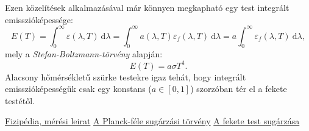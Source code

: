 \documentclass[a4paper, 12pt]{article}
\begin{document}
    Ezen közelítések alkalmazásával már könnyen megkapható egy test integrált emisszióképessége:
    \begin{equation}
        E(T)=\int_{0}^{\infty} \varepsilon(\lambda, T)~\mathrm{d}\lambda=\int_{0}^{\infty} a(\lambda, T)\varepsilon_f(\lambda, T)~\mathrm{d}\lambda=a \int_{0}^{\infty} \varepsilon_f(\lambda, T)~\mathrm{d}\lambda,
    \end{equation}
    mely a \textit{Stefan-Boltzmann-törvény} alapján:
    \begin{equation}
        E(T)=a\sigma T^4.
    \end{equation}
    Alacsony hőmérsékletű szürke testekre igaz tehát, hogy integrált emisszióképességük csak egy konstans ($a\in[0, 1]$) szorzóban tér el a fekete testétől.

    \begin{thebibliography}

         \href{https://fizipedia.bme.hu/index.php/H%C5%91m%C3%A9rs%C3%A9kleti_sug%C3%A1rz%C3%A1s_vizsg%C3%A1lata}{Fizipédia, mérési leirat}
         \href{https://en.wikipedia.org/wiki/Planck%27s_law}{A Planck-féle sugárzási törvény}
         \href{https://glossary.periodni.com/glossary.php?en=blackbody+radiation}{A fekete test sugárzása}
    \end{thebibliography}
\end{document}
